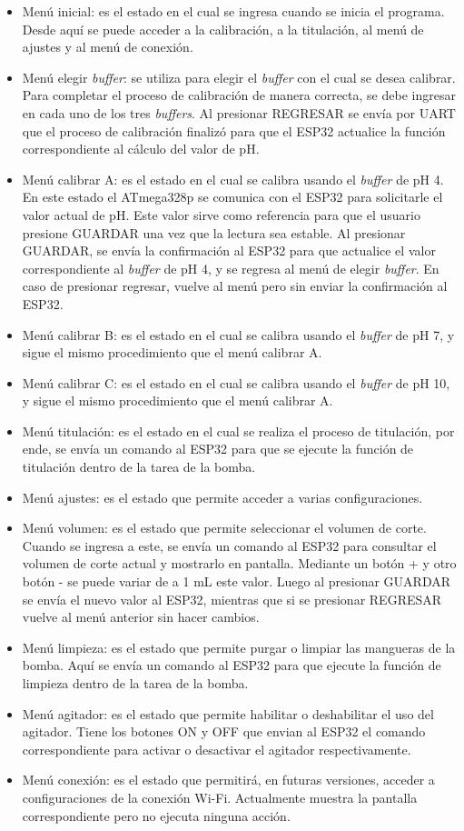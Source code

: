 \begin{itemize}
\item Menú inicial: es el estado en el cual se ingresa cuando se inicia el programa. Desde aquí se puede acceder a la calibración, a la titulación, al menú de ajustes y al menú de conexión.
\item Menú elegir \textit{buffer}: se utiliza para elegir el \textit{buffer}  con el cual se desea calibrar. Para completar el proceso de calibración de manera correcta, se debe ingresar en cada uno de los tres \textit{buffers}. Al presionar REGRESAR se envía por UART que el proceso de calibración finalizó para que el ESP32 actualice la función correspondiente al cálculo del valor de pH.
\item Menú calibrar A: es el estado en el cual se calibra usando el \textit{buffer} de pH 4. En este estado el ATmega328p se comunica con el ESP32 para solicitarle el valor actual de pH. Este valor sirve como referencia para que el usuario presione GUARDAR una vez que la lectura sea estable. Al presionar GUARDAR, se envía la confirmación al ESP32 para que actualice el valor correspondiente al \textit{buffer} de pH 4, y se regresa al menú de elegir \textit{buffer}. En caso de presionar regresar, vuelve al menú pero sin enviar la confirmación al ESP32.
\item Menú calibrar B: es el estado en el cual se calibra usando el \textit{buffer} de pH 7, y sigue el mismo procedimiento que el menú calibrar A.
\item Menú calibrar C: es el estado en el cual se calibra usando el \textit{buffer} de pH 10, y sigue el mismo procedimiento que el menú calibrar A.
\item Menú titulación: es el estado en el cual se realiza el proceso de titulación, por ende, se envía un comando al ESP32 para que se ejecute la función de titulación dentro de la tarea de la bomba.
\item Menú ajustes: es el estado que permite acceder a varias configuraciones.
\item Menú volumen: es el estado que permite seleccionar el volumen de corte. Cuando se ingresa a este, se envía un comando al ESP32 para consultar el volumen de corte actual y mostrarlo en pantalla. Mediante un botón + y otro botón - se puede variar de a 1 mL este valor. Luego al presionar GUARDAR se envía el nuevo valor al ESP32, mientras que si se presionar REGRESAR vuelve al menú anterior sin hacer cambios.
\item Menú limpieza: es el estado que permite purgar o limpiar las mangueras de la bomba.  Aquí se envía un comando al ESP32 para que ejecute la función de limpieza dentro de la tarea de la bomba.
\item Menú agitador: es el estado que permite habilitar o deshabilitar el uso del agitador. Tiene los botones ON y OFF que envian al ESP32 el comando correspondiente para activar o desactivar el agitador respectivamente.
\item Menú conexión: es el estado que permitirá, en futuras versiones, acceder a configuraciones de la conexión Wi-Fi. Actualmente muestra la pantalla correspondiente pero no ejecuta ninguna acción.
\end{itemize}

